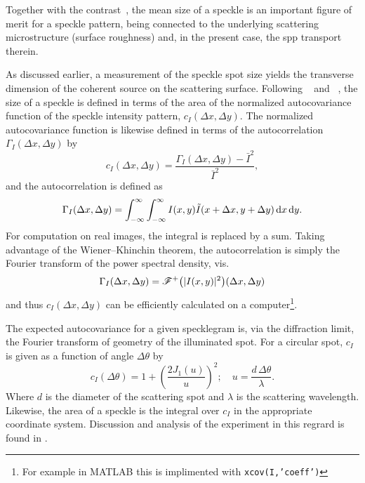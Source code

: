Together with the contrast~\cite{goodman1975dependence}, the mean size of a
speckle is an important figure of merit for a speckle pattern, being connected
to the underlying scattering microstructure (surface roughness) and, in the
present case, the \gls{spp} transport therein.

As discussed earlier, a measurement of the speckle spot
size yields the transverse dimension of the coherent source
on the scattering surface.
Following ~\cite{goodman1975statistical} and
~\cite{dainty1975laser}, the size of a speckle is defined in
terms of the area of the normalized autocovariance function of the speckle
intensity pattern, $c_I(\Delta x, \Delta y)$.  The normalized autocovariance
function is likewise defined in terms of the autocorrelation $\Gamma_I(\Delta
	x, \Delta y)$ by
\begin{equation}
	c_I(\Delta x, \Delta y) = \frac{\Gamma_I(\Delta x, \Delta y) - \bar{I}^2}{\bar{I}^2},
	\label{eqn:normxcov}
\end{equation}
and the autocorrelation is defined as
\begin{equation}
	\Gamma_I(\Delta x, \Delta y) = \int_{-\infty}^{\infty}\int_{-\infty}^{\infty} I(x,y) \tilde{I}(x+\Delta x,y+\Delta y) \,\mathrm{d} x \,\mathrm{d} y.
\end{equation}
For computation on real images, the integral is replaced by a sum.  Taking
advantage of the Wiener–Khinchin theorem, the autocorrelation is simply the
Fourier transform of the power spectral density, vis.
\begin{equation}
	\Gamma_I(\Delta x, \Delta y) = {\mathscr{F}^{+}\bigl(|I(x,y)|^2\bigr)}(\Delta x, \Delta y)
\end{equation}
and thus  $c_I(\Delta x, \Delta y)$ can be efficiently calculated on a
computer\footnote{For example in MATLAB this is implimented with
	\texttt{xcov(I,'coeff')}}.

The expected autocovariance for a given specklegram is, via the diffraction
limit, the Fourier transform of geometry of the illuminated spot.  For a
circular spot, $c_I$ is given as a function of angle $\Delta \theta$ by
\begin{equation}
	c_I{\left(\Delta \theta\right)} = 1 + {\left(\frac{2 J_1(u)}{u}\right)}^2;\quad
	u=\frac{d\, \Delta\theta}{\lambda}.
	\label{eqn:angularsize}
\end{equation}
Where $d$ is the diameter of the scattering spot and $\lambda$ is the
scattering wavelength.  Likewise, the area of a speckle is the integral over
$c_I$ in the appropriate coordinate system.  Discussion and analysis of the
experiment in this regrard is found in .

